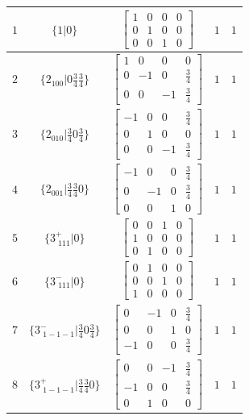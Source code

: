 \documentclass[fleqn,8pt]{jsarticle}
\begin{document}
\begin{longtable}{ccccc}
$ 1 $ & $ \{1|0\} $ & $ \begin{bmatrix} 1 & 0 & 0 & 0 \\ 0 & 1 & 0 & 0 \\ 0 & 0 & 1 & 0 \end{bmatrix} $ & $ 1 $ & $ 1 $ \\ \hline
$ 2 $ & $ \{2{}_{100}|0 \frac{3}{4} \frac{3}{4}\} $ & $ \begin{bmatrix} 1 & 0 & 0 & 0 \\ 0 & -1 & 0 & \frac{3}{4} \\ 0 & 0 & -1 & \frac{3}{4} \end{bmatrix} $ & $ 1 $ & $ 1 $ \\ \hline
$ 3 $ & $ \{2{}_{010}|\frac{3}{4} 0 \frac{3}{4}\} $ & $ \begin{bmatrix} -1 & 0 & 0 & \frac{3}{4} \\ 0 & 1 & 0 & 0 \\ 0 & 0 & -1 & \frac{3}{4} \end{bmatrix} $ & $ 1 $ & $ 1 $ \\ \hline
$ 4 $ & $ \{2{}_{001}|\frac{3}{4} \frac{3}{4} 0\} $ & $ \begin{bmatrix} -1 & 0 & 0 & \frac{3}{4} \\ 0 & -1 & 0 & \frac{3}{4} \\ 0 & 0 & 1 & 0 \end{bmatrix} $ & $ 1 $ & $ 1 $ \\ \hline
$ 5 $ & $ \{3^{+}_{\,\,111}|0\} $ & $ \begin{bmatrix} 0 & 0 & 1 & 0 \\ 1 & 0 & 0 & 0 \\ 0 & 1 & 0 & 0 \end{bmatrix} $ & $ 1 $ & $ 1 $ \\ \hline
$ 6 $ & $ \{3^{-}_{\,\,111}|0\} $ & $ \begin{bmatrix} 0 & 1 & 0 & 0 \\ 0 & 0 & 1 & 0 \\ 1 & 0 & 0 & 0 \end{bmatrix} $ & $ 1 $ & $ 1 $ \\ \hline
$ 7 $ & $ \{3^{-}_{\,\,1-1-1}|\frac{3}{4} 0 \frac{3}{4}\} $ & $ \begin{bmatrix} 0 & -1 & 0 & \frac{3}{4} \\ 0 & 0 & 1 & 0 \\ -1 & 0 & 0 & \frac{3}{4} \end{bmatrix} $ & $ 1 $ & $ 1 $ \\ \hline
$ 8 $ & $ \{3^{+}_{\,\,1-1-1}|\frac{3}{4} \frac{3}{4} 0\} $ & $ \begin{bmatrix} 0 & 0 & -1 & \frac{3}{4} \\ -1 & 0 & 0 & \frac{3}{4} \\ 0 & 1 & 0 & 0 \end{bmatrix} $ & $ 1 $ & $ 1 $ \\ \hline

\end{longtable}
\end{document}

